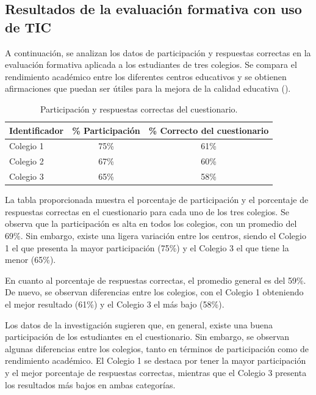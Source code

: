 \documentclass[spanish]{textolivre}
\begin{document}
\subsection{Resultados de la evaluación formativa con uso de TIC}
A continuación, se analizan los datos de participación y respuestas correctas en la evaluación formativa aplicada a los estudiantes de tres colegios. Se compara el rendimiento académico entre los diferentes centros educativos y se obtienen afirmaciones que puedan ser útiles para la mejora de la calidad educativa ().

\begin{table}[h!]
\centering
\begin{threeparttable}
\caption{Participación y respuestas correctas del cuestionario.}\label{tab-4}
\begin{tabular}{lcc}
\toprule
Identificador & \% Participación & \% Correcto del cuestionario \\
\midrule
Colegio 1 & 75\% & 61\% \\
Colegio 2 & 67\% & 60\% \\
Colegio 3 & 65\% & 58\% \\
\bottomrule
\end{tabular}
\end{threeparttable}
\end{table}

La tabla proporcionada muestra el porcentaje de participación y el porcentaje de respuestas correctas en el cuestionario para cada uno de los tres colegios. Se observa que la participación es alta en todos los colegios, con un promedio del 69\%. Sin embargo, existe una ligera variación entre los centros, siendo el Colegio 1 el que presenta la mayor participación (75\%) y el Colegio 3 el que tiene la menor (65\%).

En cuanto al porcentaje de respuestas correctas, el promedio general es del 59\%. De nuevo, se observan diferencias entre los colegios, con el Colegio 1 obteniendo el mejor resultado (61\%) y el Colegio 3 el más bajo (58\%).

Los datos de la investigación sugieren que, en general, existe una buena participación de los estudiantes en el cuestionario. Sin embargo, se observan algunas diferencias entre los colegios, tanto en términos de participación como de rendimiento académico. El Colegio 1 se destaca por tener la mayor participación y el mejor porcentaje de respuestas correctas, mientras que el Colegio 3 presenta los resultados más bajos en ambas categorías.
\end{document}
